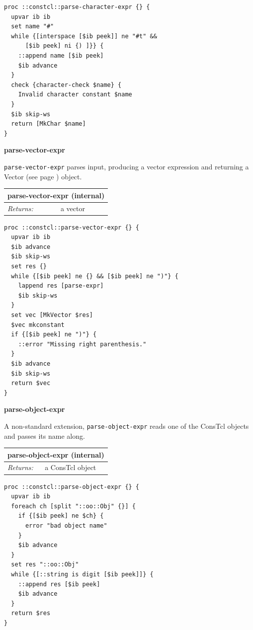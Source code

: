 \documentclass[twoside,9pt]{report}
\begin{document}
\noindent\makebox[\linewidth]{\rule{\linewidth}{0.4pt}}
\begin{lstlisting}
proc ::constcl::parse-character-expr {} {
  upvar ib ib
  set name "#"
  while {[interspace [$ib peek]] ne "#t" &&
      [$ib peek] ni {) ]}} {
    ::append name [$ib peek]
    $ib advance
  }
  check {character-check $name} {
    Invalid character constant $name
  }
  $ib skip-ws
  return [MkChar $name]
}
\end{lstlisting}
\noindent\makebox[\linewidth]{\rule{\linewidth}{0.4pt}}

\textbf{parse-vector-expr}


\texttt{parse-vector-expr} parses input, producing a vector expression and returning a Vector (see page \pageref{vectors}) object.

\begin{tabular}{ |l l| }
\hline
\multicolumn{2}{|l|}{parse-vector-expr (internal)} \\
\hline
\textit{Returns:} & a vector \\
\hline
\end{tabular}

\noindent\makebox[\linewidth]{\rule{\linewidth}{0.4pt}}
\begin{lstlisting}
proc ::constcl::parse-vector-expr {} {
  upvar ib ib
  $ib advance
  $ib skip-ws
  set res {}
  while {[$ib peek] ne {} && [$ib peek] ne ")"} {
    lappend res [parse-expr]
    $ib skip-ws
  }
  set vec [MkVector $res]
  $vec mkconstant
  if {[$ib peek] ne ")"} {
    ::error "Missing right parenthesis."
  }
  $ib advance
  $ib skip-ws
  return $vec
}
\end{lstlisting}
\noindent\makebox[\linewidth]{\rule{\linewidth}{0.4pt}}

\textbf{parse-object-expr}


A non-standard extension, \texttt{parse-object-expr} reads one of the ConsTcl objects and passes its name along.

\begin{tabular}{ |l l| }
\hline
\multicolumn{2}{|l|}{parse-object-expr (internal)} \\
\hline
\textit{Returns:} & a ConsTcl object \\
\hline
\end{tabular}

\noindent\makebox[\linewidth]{\rule{\linewidth}{0.4pt}}
\begin{lstlisting}
proc ::constcl::parse-object-expr {} {
  upvar ib ib
  foreach ch [split "::oo::Obj" {}] {
    if {[$ib peek] ne $ch} {
      error "bad object name"
    }
    $ib advance
  }
  set res "::oo::Obj"
  while {[::string is digit [$ib peek]]} {
    ::append res [$ib peek]
    $ib advance
  }
  return $res
}
\end{lstlisting}
\noindent\makebox[\linewidth]{\rule{\linewidth}{0.4pt}}
\end{document}
